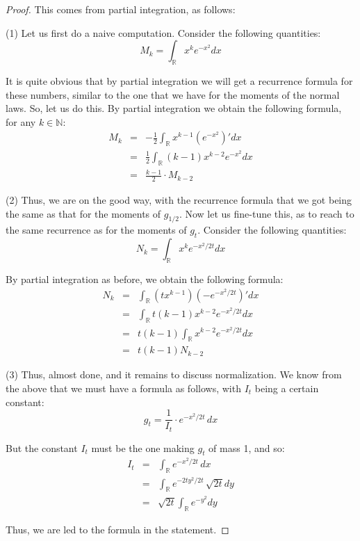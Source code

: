 \documentclass[12pt]{amsbook}
\begin{document}
\begin{proof}
This comes from partial integration, as follows:

\medskip

(1) Let us first do a naive computation. Consider the following quantities:
$$M_k=\int_\mathbb Rx^ke^{-x^2}dx$$

It is quite obvious that by partial integration we will get a recurrence formula for these numbers, similar to the one that we have for the moments of the normal laws. So, let us do this. By partial integration we obtain the following formula, for any $k\in\mathbb N$:
\begin{eqnarray*}
M_k
&=&-\frac{1}{2}\int_\mathbb Rx^{k-1}\left(e^{-x^2}\right)'dx\\
&=&\frac{1}{2}\int_\mathbb R(k-1)x^{k-2}e^{-x^2}dx\\
&=&\frac{k-1}{2}\cdot M_{k-2}
\end{eqnarray*}

(2) Thus, we are on the good way, with the recurrence formula that we got being the same as that for the moments of $g_{1/2}$. Now let us fine-tune this, as to reach to the same recurrence as for the moments of $g_t$. Consider the following quantities:
$$N_k=\int_\mathbb Rx^ke^{-x^2/2t}dx$$

By partial integration as before, we obtain the following formula:
\begin{eqnarray*}
N_k
&=&\int_\mathbb R(tx^{k-1})\left(-e^{-x^2/2t}\right)'dx\\
&=&\int_\mathbb Rt(k-1)x^{k-2}e^{-x^2/2t}dx\\
&=&t(k-1)\int_\mathbb Rx^{k-2}e^{-x^2/2t}dx\\
&=&t(k-1)N_{k-2}
\end{eqnarray*}

(3) Thus, almost done, and it remains to discuss normalization. We know from the above that we must have a formula as follows, with $I_t$ being a certain constant:
$$g_t=\frac{1}{I_t}\cdot e^{-x^2/2t}\,dx$$

But the constant $I_t$ must be the one making $g_t$ of mass 1, and so:
\begin{eqnarray*}
I_t
&=&\int_\mathbb Re^{-x^2/2t}\,dx\\
&=&\int_\mathbb Re^{-2ty^2/2t}\,\sqrt{2t}dy\\
&=&\sqrt{2t}\int_\mathbb Re^{-y^2}dy
\end{eqnarray*}

Thus, we are led to the formula in the statement.
\end{proof}
\end{document}
